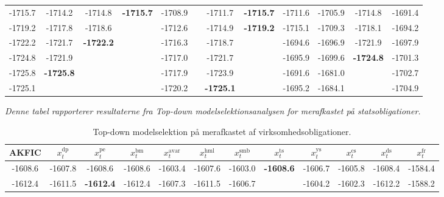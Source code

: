 \documentclass[
  a4paper,
  oneside]{memoir}
\begin{document}
\begin{landscape}
\begin{table}[H]
\begin{threeparttable}
\begin{tabular}[t]{cccccccccccc}
-1715.7 & -1714.2 & -1714.8 & \textbf{-1715.7} & -1708.9 &  & -1711.7 & \textbf{-1715.7} & -1711.6 & -1705.9 & -1714.8 & -1691.4\\
 
\rowcolor{gray!6}  -1719.2 & -1717.8 & -1718.6 &  & -1712.6 &  & -1714.9 & \textbf{-1719.2} & -1715.1 & -1709.3 & -1718.1 & -1694.2\\
 
-1722.2 & -1721.7 & \textbf{-1722.2} &  & -1716.3 &  & -1718.7 &  & -1694.6 & -1696.9 & -1721.9 & -1697.9\\
 
\rowcolor{gray!6}  -1724.8 & -1721.9 &  &  & -1717.0 &  & -1721.7 &  & -1695.9 & -1699.6 & \textbf{-1724.8} & -1701.3\\
 
-1725.8 & \textbf{-1725.8} &  &  & -1717.9 &  & -1723.9 &  & -1691.6 & -1681.0 &  & -1702.7\\
 
\rowcolor{gray!6}  -1725.1 &  &  &  & -1720.2 &  & \textbf{-1725.1} &  & -1695.2 & -1684.1 &  & -1704.9\\
\bottomrule
\end{tabular}
\begin{tablenotes}
\item \textit{Denne tabel rapporterer resultaterne fra \textit{Top-down} modelselektionsanalysen for merafkastet på statsobligationer.}
\end{tablenotes}
\end{threeparttable}
\end{table}

\begin{table}[H]

\caption{\label{tab:STEP-V-TABLE}Top-down modelselektion på merafkastet af virksomhedsobligationer.}
\centering
\begin{threeparttable}
\begin{tabular}[t]{cccccccccccc}
\toprule
AKFIC & $x_t^{\text{dp}}$ & $x_t^{\text{pe}}$ & $x_t^{\text{bm}}$ & $x_t^{\text{avar}}$ & $x_t^{\text{hml}}$ & $x_t^{\text{smb}}$ & $x_t^{\text{ts}}$ & $x_t^{\text{ys}}$ & $x_t^{\text{cs}}$ & $x_t^{\text{ds}}$ & $x_t^{\text{fr}}$\\
\midrule
\rowcolor{gray!6}  -1608.6 & -1607.8 & -1608.6 & -1608.6 & -1603.4 & -1607.6 & -1603.0 & \textbf{-1608.6} & -1606.7 & -1605.8 & -1608.4 & -1584.4\\
 
-1612.4 & -1611.5 & \textbf{-1612.4} & -1612.4 & -1607.3 & -1611.5 & -1606.7 &  & -1604.2 & -1602.3 & -1612.2 & -1588.2\\
 

\end{tabular}
\end{threeparttable}
\end{table}
\end{landscape}
\end{document}
